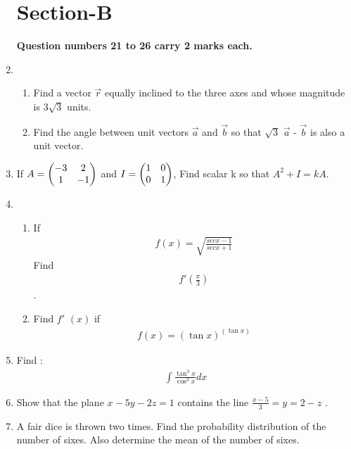 \documentclass[journal,12pt,twocolumn]{IEEEtran}
\renewcommand\thesection{\arabic{section}}
\begin{document}
\begin{enumerate}[label=\thesection.\arabic*.,ref=\thesection.\theenumi]
\section{Section-B}

\textbf{Question numbers 21 to 26 carry 2 marks each.}\\


\item  \begin{enumerate} \item Find a vector $\overrightarrow{r}$ equally inclined to the three axes and whose magnitude is $3\sqrt{3}$ units.   
\item Find the angle between unit vectors $\overrightarrow{a}$ and $\overrightarrow{b}$ so that $\sqrt{3}$ $\overrightarrow{a}$ - $\overrightarrow{b}$ is also a unit vector.\\
\end{enumerate}
\item If $A=\begin{pmatrix}-3 & 2 \\ 1 & -1\end{pmatrix} $ and $ I=\begin{pmatrix}1 & 0 \\ 0 & 1\end{pmatrix}$, Find scalar k so that $A^2 + I = kA$.\\

\item \begin{enumerate} \item If \begin{align} f\left(x\right)= \sqrt{\frac{sec x-1}{sec x+1}}\nonumber \end{align} Find \begin{align} f'\left(\frac{\pi}{3}\right) \nonumber \end{align}.

\item Find $f'$ $\left(x\right)$ if \begin{align} f\left(x\right)=\left(\tan x\right)^{\left(\tan x\right)} \nonumber \end{align}
\end{enumerate}

\item Find :\begin{align} \int \frac{\tan^3x}{\cos^3x} dx \nonumber \end{align} 

\item Show that the plane $ x-5y-2z=1 $ contains the line $ \frac{x-5}{3}=y=2-z $ .\\

\item A fair dice is thrown two times. Find the probability distribution of the number of sixes. Also determine the mean of the number of sixes.\\


\end{enumerate}
\end{document}
